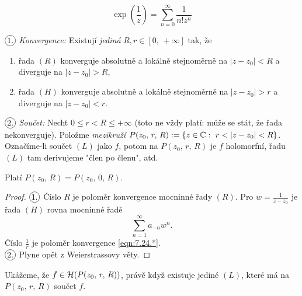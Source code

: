 \begin{example}
$$\exp\left(\frac{1}{z}\right)=\sum_{n=0}^\infty\frac{1}{n!z^n}$$
\end{example}
\begin{properties}[L]
$\circled{1.}$ \emph{Konvergence:} Existují \emph{jediná} $R,r\in[0,\, +\infty]$ tak, že 
\begin{enumerate}
    \item
        řada $(R)$ konverguje absolutně a lokálně stejnoměrně na $|z-z_0|<R$ a diverguje na $|z-z_0|>R$, 
    \item
        řada $(H)$ konverguje absolutně a lokálně stejnoměrně na $|z-z_0|>r$ a diverguje na $|z-z_0|<r$.
\end{enumerate}

$\circled{2.}$ \emph{Součet:} Nechť $0\leq r<R\leq+\infty$ (toto ne vždy platí: může se stát, že řada nekonverguje). Položme \emph{mezikruží} $P(z_0,\,r,\, R) :=\{z\in\Comp:\ r<|z-z_0|<R\}$. Označíme-li součet $(L)$ jako $f$, potom na $P(z_0,\, r,\, R)$ je $f$ holomorfní, řadu $(L)$ tam derivujeme "člen po členu", atd.
\end{properties}

\begin{note} Platí
$P(z_0,\,R)=P(z_0,\,0,\,R)$. %
\end{note}

\begin{proof}
$\circled{1.}$ Číslo $R$ je poloměr konvergence mocninné řady $(R)$. Pro $w=\frac{1}{z-z_0}$ je řada $(H)$ rovna mocninné řadě 
\begin{equation}
    \sum_{n=1}^\infty a_{-n}w^n.
    \tag{*}
    \label{eqn:7.24.*}
\end{equation} Číslo $\frac{1}{r}$ je poloměr konvergence \cref{eqn:7.24.*}.\\
$\circled{2.}$ Plyne opět z Weierstrassovy věty.
\end{proof}

 Ukážeme, že $f\in\operatorname{\mathcal{H}}(P(z_0,\,r,\, R))$, právě když existuje jediné $(L)$, které má na $P(z_0,\, r,\, R)$ součet $f$.
